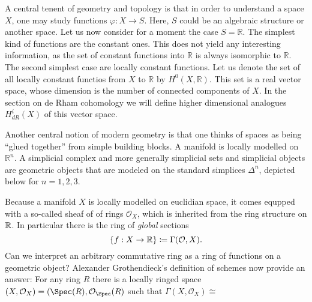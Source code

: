 A central tenent of geometry and topology is that in order to understand a space $X$, one may study functions $\varphi: X \to S$. Here, $S$ could be an algebraic structure or another space. Let us now consider for a moment the case $S=\mathbb{R}$. The simplest kind of functions are the constant ones. This does not yield any interesting information, as the set of constant functions into $\mathbb{R}$ is always isomorphic to $\mathbb{R}$. The second simplest case are locally constant functions. Let us denote the set of all locally constant functios from $X$ to $\mathbb{R}$ by $H^0(X,\mathbb{R})$. This set is a real vector space, whose dimension is the number of connected components of $X$. In the section on de Rham cohomology we will define higher dimensional analogues $H^i_{dR}(X)$ of this vector space.

Another central notion of modern geometry is that one thinks of spaces as being “glued together” from simple building blocks. A manifold is locally modelled on $\mathbb{R}^n$. A simplicial complex and more generally simplicial sets and simplicial objects are geometric objects that are modeled on the standard simplices $\Delta^n$, depicted below for $n = 1,2,3$.


Because a manifold $X$ is locally modelled on euclidian space, it comes equpped with a so-called sheaf of of rings $\mathcal{O}_X$, which is inherited from the ring structure on $\mathbb{R}$. In particular there is the ring of \textit{global} sections
\[\{f: X \to \mathbb{R} \} \coloneqq  \Gamma(\mathcal{O}, X).\]
Can we interpret an arbitrary commutative ring as a ring of functions on a geometric object?
Alexander Grothendieck's definition of schemes now provide an answer: For any ring $R$ there is a locally ringed space $(X, \mathcal{O}_X) = (\Spec(R), \mathcal{O}_\Spec(R)$ such that $\Gamma(X, \mathcal{O}_X) \cong$
